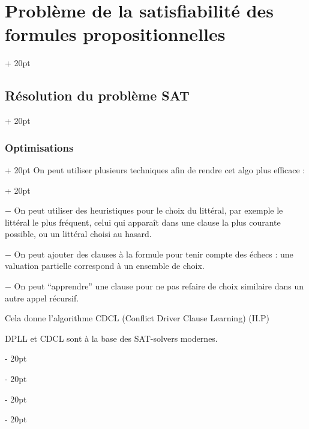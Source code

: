 \documentclass[a4paper, 12pt, twoside]{article}
\newcommand{\ind}[1][20pt]{\advance\leftskip + #1}
\newcommand{\deind}[1][20pt]{\advance\leftskip - #1}
\newenvironment{indt}[2][20pt]{#2 \par \ind[#1]}{\par \deind} %
\begin{document}
\begin{indt}{\section{Problème de la satisfiabilité des formules propositionnelles}}
\begin{indt}{\subsection{Résolution du problème SAT}}
\begin{indt}{\subsubsection{Optimisations}}
\begin{indt}{On peut utiliser plusieurs techniques afin de rendre cet algo plus efficace :}
                    \vspace{12pt}
                    
                    $-$ On peut utiliser des heuristiques pour le choix du littéral, par exemple le littéral le plus fréquent, celui qui apparaît dans une clause la plus courante possible, ou un littéral choisi au hasard.
                    
                    \vspace{12pt}
                    
                    $-$ On peut ajouter des clauses à la formule pour tenir compte des échecs : une valuation partielle correspond à un ensemble de choix.
                    
                    \vspace{12pt}
                    
                    $-$ On peut ``apprendre'' une clause pour ne pas refaire de choix similaire dans un autre appel récursif.
                    
                    Cela donne l'algorithme CDCL (Conflict Driver Clause Learning) (H.P)
                    
                    DPLL et CDCL sont à la base des SAT-solvers modernes.
                \end{indt}
            \end{indt}
        \end{indt}
        
    \end{indt}
    
    
    
\end{document}
